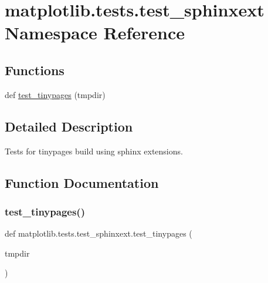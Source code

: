 \hypertarget{namespacematplotlib_1_1tests_1_1test__sphinxext}{}\section{matplotlib.\+tests.\+test\+\_\+sphinxext Namespace Reference}
\label{namespacematplotlib_1_1tests_1_1test__sphinxext}
\subsection*{Functions}
\begin{DoxyCompactItemize}
\item 
def \hyperlink{namespacematplotlib_1_1tests_1_1test__sphinxext_aae1201c1cf265d91230b536ac42983f1}{test\+\_\+tinypages} (tmpdir)
\end{DoxyCompactItemize}


\subsection{Detailed Description}
\begin{DoxyVerb}Tests for tinypages build using sphinx extensions.\end{DoxyVerb}
 

\subsection{Function Documentation}
\mbox{\label{namespacematplotlib_1_1tests_1_1test__sphinxext_aae1201c1cf265d91230b536ac42983f1}} 
\subsubsection{\texorpdfstring{test\+\_\+tinypages()}{test\_tinypages()}}
{\footnotesize\ttfamily def matplotlib.\+tests.\+test\+\_\+sphinxext.\+test\+\_\+tinypages (\begin{DoxyParamCaption}\item[{}]{tmpdir }\end{DoxyParamCaption})}

